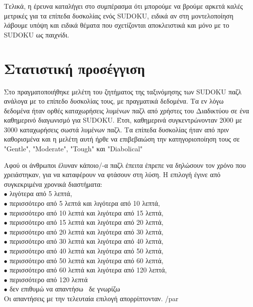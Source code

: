\documentclass[12pt]{book}
\theoremstyle{definition}
\begin{document}
Τελικά, η έρευνα \cite{5} καταλήγει στο συμπέρασμα ότι μπορούμε να βρούμε αρκετά καλές μετρικές για τα επίπεδα δυσκολίας ενός SUDOKU, ειδικά αν στη μοντελοποίηση λάβουμε υπόψη και ειδικά θέματα που σχετίζονται αποκλειστικά και μόνο με το SUDOKU ως παιχνίδι.

\section{Στατιστική προσέγγιση}

Στο \cite{9} πραγματοποιήθηκε μελέτη του ζητήματος της ταξινόμησης των SUDOKU παζλ ανάλογα με το επίπεδο δυσκολίας τους, με πραγματικά δεδομένα. Τα εν λόγω δεδομένα ήταν ορθές καταχωρήσεις λυμένων παζλ από χρήστες του Διαδικτύου σε ένα καθημερινό διαγωνισμό για SUDOKU. Έτσι, καθημερινά συγκεντρώνονταν 2000 με 3000 καταχωρήσεις σωστά λυμένων παζλ. Τα επίπεδα δυσκολίας ήταν από πριν καθορισμένα και η μελέτη αυτή ήρθε να επιβεβαιώση την κατηγοριοποίηση τους σε "Gentle", "Moderate", "Tough" και "Diabolical" \par

Αφού οι άνθρωποι έλυναν κάποιο/-α παζλ έπειτα έπρεπε να δηλώσουν τον χρόνο που χρειάστηκαν, για να καταφέρουν να φτάσουν στη λύση. Η επιλογή έγινε από συγκεκριμένα χρονικά διαστήματα: \\
\(\bullet\) λιγότερα από 5 λεπτά, \\
\(\bullet\) περισσότερο από 5 λεπτά και λιγότερα από 10 λεπτά, \\
\(\bullet\) περισσότερο από 10 λεπτά και λιγότερα από 15 λεπτά, \\
\(\bullet\) περισσότερο από 15 λεπτά και λιγότερα από 20 λεπτά, \\
\(\bullet\) περισσότερο από 20 λεπτά και λιγότερα από 30 λεπτά, \\
\(\bullet\) περισσότερο από 30 λεπτά και λιγότερα από 40 λεπτά, \\
\(\bullet\) περισσότερο από 40 λεπτά και λιγότερα από 50 λεπτά, \\
\(\bullet\) περισσότερο από 50 λεπτά και λιγότερα από 60 λεπτά, \\
\(\bullet\) περισσότερο από 60 λεπτά και λιγότερα από 120 λεπτά, \\
\(\bullet\) περισσότερο από 120 λεπτά \\
\(\bullet\) δεν επιθυμώ να απαντήσω \ δε γνωρίζω \\

Οι απαντήσεις με την τελευταία επιλογή απορρίπτονταν.  /par
\end{document}
